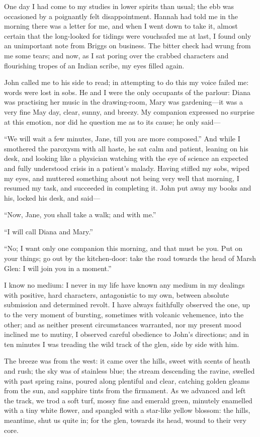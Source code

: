 One day I had come to my studies in lower spirits than usual; the ebb
was occasioned by a poignantly felt disappointment. Hannah had told me
in the morning there was a letter for me, and when I went down to take
it, almost certain that the long-looked for tidings were vouchsafed me
at last, I found only an unimportant note from \Mr{} Briggs on business.
The bitter check had wrung from me some tears; and now, as I sat poring
over the crabbed characters and flourishing tropes of an Indian scribe,
my eyes filled again.

\St{} John called me to his side to read; in attempting to do this my
voice failed me: words were lost in sobs. He and I were the only
occupants of the parlour: Diana was practising her music in the
drawing-room, Mary was gardening---it was a very fine May day, clear,
sunny, and breezy. My companion expressed no surprise at this emotion,
nor did he question me as to its cause; he only said---

\enquote{We will wait a few minutes, Jane, till you are more composed.}
And while I smothered the paroxysm with all haste, he sat calm and
patient, leaning on his desk, and looking like a physician watching with
the eye of science an expected and fully understood crisis in a
patient's malady. Having stifled my sobs, wiped my eyes, and muttered
something about not being very well that morning, I resumed my task, and
succeeded in completing it. \St{} John put away my books and his, locked
his desk, and said---

\enquote{Now, Jane, you shall take a walk; and with me.}

\enquote{I will call Diana and Mary.}

\enquote{No; I want only one companion this morning, and that must be
	you. Put on your things; go out by the kitchen-door: take the road
	towards the head of Marsh Glen: I will join you in a moment.}

I know no medium: I never in my life have known any medium in my
dealings with positive, hard characters, antagonistic to my own, between
absolute submission and determined revolt. I have always faithfully
observed the one, up to the very moment of bursting, sometimes with
volcanic vehemence, into the other; and as neither present circumstances
warranted, nor my present mood inclined me to mutiny, I observed careful
obedience to \St{} John's directions; and in ten minutes I was treading
the wild track of the glen, side by side with him.

The breeze was from the west: it came over the hills, sweet with scents
of heath and rush; the sky was of stainless blue; the stream descending
the ravine, swelled with past spring rains, poured along plentiful and
clear, catching golden gleams from the sun, and sapphire tints from the
firmament. As we advanced and left the track, we trod a soft turf,
mossy fine and emerald green, minutely enamelled with a tiny white
flower, and spangled with a star-like yellow blossom: the hills,
meantime, shut us quite in; for the glen, towards its head, wound to
their very core.

